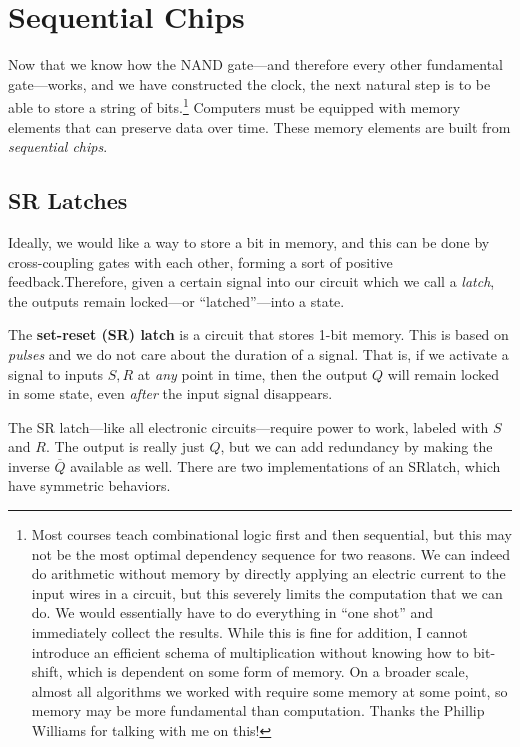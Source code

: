 \section{Sequential Chips}

  Now that we know how the NAND gate---and therefore every other fundamental gate---works, and we have constructed the clock, the next natural step is to be able to store a string of bits.\footnote{Most courses teach combinational logic first and then sequential, but this may not be the most optimal dependency sequence for two reasons. We can indeed do arithmetic without memory by directly applying an electric current to the input wires in a circuit, but this severely limits the computation that we can do. We would essentially have to do everything in ``one shot'' and immediately collect the results. While this is fine for addition, I cannot introduce an efficient schema of multiplication without knowing how to bit-shift, which is dependent on some form of memory. On a broader scale, almost all algorithms we worked with require some memory at some point, so memory may be more fundamental than computation. Thanks the Phillip Williams for talking with me on this!} Computers must be equipped with memory elements that can preserve data over time. These memory elements are built from \textit{sequential chips}. 

\subsection{SR Latches}

  Ideally, we would like a way to store a bit in memory, and this can be done by cross-coupling gates with each other, forming a sort of positive feedback.Therefore, given a certain signal into our circuit which we call a \textit{latch}, the outputs remain locked---or ``latched''---into a state. 

  \begin{definition}[SR Latch]
    \label{def:sr-latch}
    The \textbf{set-reset (SR) latch} is a circuit that stores 1-bit memory. This is based on \textit{pulses} and we do not care about the duration of a signal. That is, if we activate a signal to inputs $S, R$ at \textit{any} point in time, then the output $Q$ will remain locked in some state, even \textit{after} the input signal disappears. 
  \end{definition}

  The SR latch---like all electronic circuits---require power to work, labeled with $S$ and $R$. The output is really just $Q$, but we can add redundancy by making the inverse $\overline{Q}$ available as well. There are two implementations of an SRlatch, which have symmetric behaviors. 

